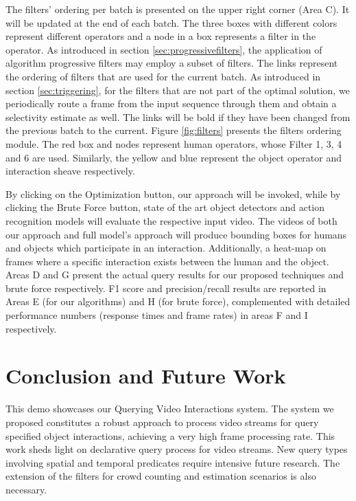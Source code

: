 \documentclass[sigconf]{acmart}
\begin{document}
The filters' ordering per batch is presented on the upper right corner (Area C). It will be updated at the end of each batch. The three boxes with different colors represent different operators and a node in a box represents a filter in the operator. 
As introduced in section \ref{sec:progressivefilters}, the application of algorithm progressive filters may employ a subset of filters. The links represent the ordering of filters that are used for the current batch. 
As introduced in section \ref{sec:triggering}, for the filters that are not part of the optimal solution, we periodically route a frame from the input sequence through them and obtain a selectivity estimate as well. The links will be bold if they have been changed from the previous batch to the current. 
Figure \ref{fig:filters} presents the filters ordering module. The red box and nodes represent human operators, whose Filter 1, 3, 4 and 6 are used. Similarly, the yellow and blue represent the object operator and interaction sheave respectively. 

By clicking on the Optimization button, our approach will be invoked, while by clicking the Brute Force button, state of the art object detectors \cite{8237584He2017} and action recognition \cite{gkioxari2018detecting} models will evaluate the respective input video. 
The videos of both our approach and full model's approach will produce bounding boxes for humans and objects which participate in an interaction. Additionally, a heat-map on frames where a specific interaction exists between the human and the object. Areas D and G present the actual query results for our proposed techniques and brute force respectively. 
F1 score and precision/recall results are reported in Areas E (for our algorithms) and H (for brute force), complemented with detailed performance numbers (response times and frame rates) in areas F and I respectively. 

\section{Conclusion and Future Work}
\label{sec:conclusion}

This demo showcases our Querying Video Interactions system.
The system we proposed constitutes a robust approach to process video streams for query specified object interactions, achieving a very high frame processing rate. 
This work sheds light on declarative query process for video streams. New query types involving spatial and temporal predicates require intensive future research. 
The extension of the filters for crowd counting and estimation scenarios is also necessary. 




\end{document}
